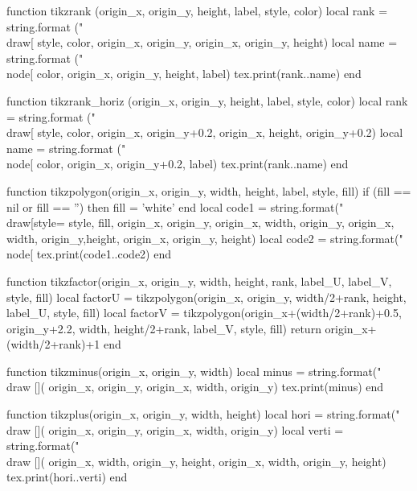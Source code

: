 \begin{luacode*}
{function tikzrank (origin_x, origin_y, height, label, style, color)
	 local rank = string.format ("\\draw[%
															 style, color, origin_x, origin_y, origin_x, origin_y, height)
	 local name = string.format ("\\node[%
															 color, origin_x, origin_y, height, label)
	 tex.print(rank..name)
end

function tikzrank_horiz (origin_x, origin_y, height, label, style, color)
	 local rank = string.format ("\\draw[%
															 style, color, origin_x, origin_y+0.2, origin_x, height, origin_y+0.2)
	 local name = string.format ("\\node[%
															 color, origin_x, origin_y+0.2, label)
	 tex.print(rank..name)
end

function tikzpolygon(origin_x, origin_y, width, height, label, style, fill)
	 if (fill == nil or fill == '') then
			fill = 'white'
	 end
	 local code1 = string.format("\\draw[style=%
															 style, fill, origin_x, origin_y, origin_x, width, origin_y, origin_x, width,
															 origin_y,height, origin_x, origin_y, height)
	 local code2 =
			string.format("\\node[%
	 tex.print(code1..code2)
end

function tikzfactor(origin_x, origin_y, width, height, rank, label_U,
										label_V,
										style, fill)
	 local factorU = tikzpolygon(origin_x, origin_y, width/2+rank, height,
															 label_U,
															 style, fill)
	 local factorV = tikzpolygon(origin_x+(width/2+rank)+0.5, origin_y+2.2, width,
															 height/2+rank, label_V,
															 style, fill)
	 return origin_x+(width/2+rank)+1
end

function tikzminus(origin_x, origin_y, width)
	 local minus = string.format("\\draw [](%
															 origin_x, origin_y, origin_x, width, origin_y)
	 tex.print(minus)
end

function tikzplus(origin_x, origin_y, width, height)
	 local hori = string.format("\\draw [](%
															origin_x, origin_y, origin_x, width, origin_y)
	 local verti = string.format("\\draw [](%
															 origin_x, width, origin_y, height, origin_x, width, origin_y, height)
	 tex.print(hori..verti)
end

}
\end{luacode*}
